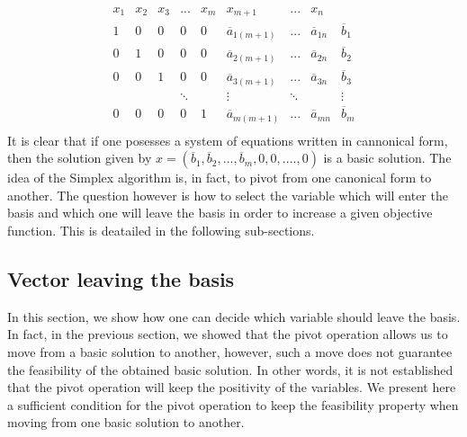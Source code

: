 \begin{equation*}
    \begin{array}{ccccccccc}
        x_1 & x_2 & x_3 & ... & x_m & x_{m+1} & ... & x_n \\
        1 & 0 & 0 & 0 & 0 & \overline a_{1(m+1)} & ... & \overline a_{1n} & \overline b_1 \\
        0 & 1 & 0 & 0 & 0 & \overline a_{2(m+1)} & ... & \overline a_{2n} & \overline b_2 \\
        0 & 0 & 1 & 0 & 0 & \overline a_{3(m+1)} & ... & \overline a_{3n} & \overline b_3 \\
        & & & \ddots & & \vdots & \ddots & & \vdots\\
        0 & 0 & 0 & 0 & 1 & \overline a_{m(m+1)} & ... & \overline a_{mn} & \overline b_m \\
    \end{array}
\end{equation*} It is clear that if one posesses a system of equations written in cannonical form, then the solution given by $x = (\overline b_1, \overline b_2, ..., \overline b_m, 0, 0, ...., 0)$ is a basic solution. The idea of the Simplex algorithm is, in fact, to pivot from one canonical form to another. The question however is how to select the variable which will enter the basis and which one will leave the basis in order to increase a given objective function. This is deatailed in the following sub-sections. 

\subsection{Vector leaving the basis}

In this section, we show how one can decide which variable should leave the basis. In fact, in the previous section, we showed that the pivot operation allows us to move from a basic solution to another, however, such a move does not guarantee the feasibility of the obtained basic solution. In other words, it is not established that the pivot operation will keep the positivity of the variables. We present here a sufficient condition for the pivot operation to keep the feasibility property when moving from one basic solution to another. 

